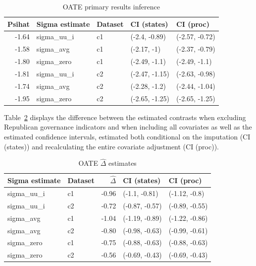 \documentclass[12pt]{article}
\begin{document}
\begin{table}[ht]
\centering
\begin{tabular}{rllll}
  \toprule
Psihat & Sigma estimate & Dataset & CI (states) & CI (proc) \\ 
  \midrule
-1.64 & sigma\_uu\_i & c1 & (-2.4, -0.89) & (-2.57, -0.72) \\ 
  -1.58 & sigma\_avg & c1 & (-2.17, -1) & (-2.37, -0.79) \\ 
  -1.80 & sigma\_zero & c1 & (-2.49, -1.1) & (-2.49, -1.1) \\ 
  -1.81 & sigma\_uu\_i & c2 & (-2.47, -1.15) & (-2.63, -0.98) \\ 
  -1.74 & sigma\_avg & c2 & (-2.28, -1.2) & (-2.44, -1.04) \\ 
  -1.95 & sigma\_zero & c2 & (-2.65, -1.25) & (-2.65, -1.25) \\ 
   \bottomrule
\end{tabular}
\caption{OATE primary results inference}
\label{tab:oateconfint}
\end{table}

Table~\ref{tab:oaterepubdiff} displays the difference between the estimated contrasts when excluding Republican governance indicators and when including all covariates as well as the estimated confidence intervals, estimated both conditional on the imputation (CI (states)) and recalculating the entire covariate adjustment (CI (proc)).

\begin{table}[ht]
\centering
\begin{tabular}{llrll}
  \toprule
Sigma estimate & Dataset & $\hat{\Delta}$ & CI (states) & CI (proc) \\ 
  \midrule
sigma\_uu\_i & c1 & -0.96 & (-1.1, -0.81) & (-1.12, -0.8) \\ 
  sigma\_uu\_i & c2 & -0.72 & (-0.87, -0.57) & (-0.89, -0.55) \\ 
  sigma\_avg & c1 & -1.04 & (-1.19, -0.89) & (-1.22, -0.86) \\ 
  sigma\_avg & c2 & -0.80 & (-0.98, -0.63) & (-0.99, -0.61) \\ 
  sigma\_zero & c1 & -0.75 & (-0.88, -0.63) & (-0.88, -0.63) \\ 
  sigma\_zero & c2 & -0.56 & (-0.69, -0.43) & (-0.69, -0.43) \\ 
   \bottomrule
\end{tabular}
\caption{OATE $\hat{\Delta}$ estimates}
\label{tab:oaterepubdiff}
\end{table}
\end{document}
